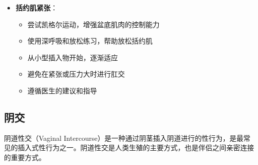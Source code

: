 \documentclass[12pt,UTF8]{ctexbook}
\begin{document}
\begin{itemize}
\begin{itemize}
		\item 尝试不同的姿势和角度，找到最刺激的位置
		\item 结合其他性刺激（如阴蒂刺激、阴茎刺激）
		\item 使用性玩具（如前列腺按摩器、震动器）
		\item 沟通并了解伴侣的性敏感点
	\end{itemize}
	\item \textbf{括约肌紧张}：
	\begin{itemize}
		\item 尝试凯格尔运动，增强盆底肌肉的控制能力
		\item 使用深呼吸和放松练习，帮助放松括约肌
		\item 从小型插入物开始，逐渐适应
		\item 避免在紧张或压力大时进行肛交
		\item 遵循医生的建议和指导
	\end{itemize}
\end{itemize}


\subsection{阴交}

阴道性交（Vaginal Intercourse）是一种通过阴茎插入阴道进行的性行为，是最常见的插入式性行为之一。阴道性交是人类生殖的主要方式，也是伴侣之间亲密连接的重要方式。
\end{document}
